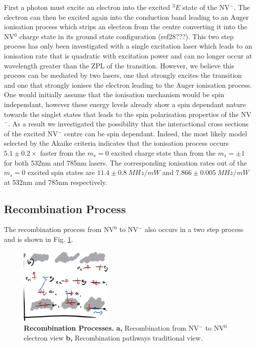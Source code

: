 \documentclass[prl]{revtex4}
\begin{document}
First a photon must excite an electron into the excited $^3E$ state of the NV$^-$. The electron can then be excited again into the conduction band leading to an Auger ionisation process which strips an electron from the centre converting it into the NV$^0$ charge state in its ground state configuration (ref28???). This two step process has only been investigated with a single excitation laser which leads to an ionisation rate that is quadratic with excitation power and can no longer occur at wavelength greater than the ZPL of the transition. However, we believe this process can be mediated by two lasers, one that strongly excites the transition and one that strongly ionises the electron leading to the Auger ionisation process. One would initially assume that the ionisation mechanism would be spin independant, however these energy levels already show a spin dependant nature towards the singlet states that leads to the spin polarisation properties of the NV$^-$. As a result we investigated the possibility that the interactional cross sections of the excited NV$^-$ centre can be spin dependant. Indeed, the most likely model selected by the Akaike criteria indicates that the ionisation process occurs $5.1\pm0.2\times$ faster from the $m_s=0$ excited charge state than from the $m_s=\pm1$ for both 532nm and 785nm lasers. The corresponding ionisation rates out of the $m_s = 0$ excited spin states are $11.4\pm\SI{0.8}{MHz/mW}$ and $7.866\pm\SI{0.005}{MHz/mW}$ at 532nm and 785nm respectively. 


\subsection{Recombination Process}
The recombination process from NV$^0$ to NV$^-$ also occurs in a two step process and is shown in Fig. \ref{FigChargeConversionb}.

\begin{figure}[H]
  \centering
  \includegraphics[width=0.4\textwidth]{ChargeConversionb.png} 
 \caption{\textbf{Recombination Processes.} \textbf{a,} Recombination from NV$^-$ to NV$^0$ electron view \textbf{b,} Recombination pathways traditional view.} \label{FigChargeConversionb}
\end{figure}
\end{document}
